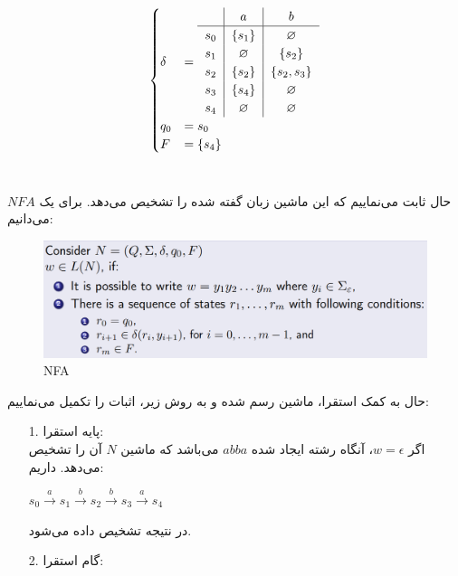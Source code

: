 \begin{enumerate}
\begin{center}
\begin{equation*}
\begin{cases}
        \delta &=
        \begin{tabular}{c|c|c}
         & $a$ & $b$ \\ \hline
        $s_0$ & $\{s_1\}$ &$\varnothing$\\
        $s_1$ & $\varnothing$ &$\{s_2\}$\\
        $s_2$ & $\{s_2\}$ &$\{s_2, s_3\}$\\
        $s_3$ & $\{s_4\}$ &$\varnothing$\\
        $s_4$ & $\varnothing$ &$\varnothing$ \\
        \end{tabular}\\[0.1in]
        q_0 &= s_0\\
        F &= \{s_4\}\\
    \end{cases}
    \end{equation*}
    \\[0.3in]
\end{center}
حال ثابت می‌نماییم که این ماشین زبان گفته شده را تشخیص می‌دهد.
برای یک $NFA$ می‌دانیم:\newline
\begin{figure} [H]
    \centering
    \includegraphics[scale=0.65]{solution/5-2.png}
        \caption{NFA}
    \label{nfa}
\end{figure}
حال به کمک استقرا، ماشین رسم شده و به روش زیر، اثبات را تکمیل می‌نماییم:\\[0.1in]
\begin{enumerate}
    \item[1.] پایه استقرا:\\[0.1in]
    اگر $w = \epsilon$، آنگاه رشته ایجاد شده $abba$ می‌باشد که ماشین $N$ آن را تشخیص می‌دهد. داریم:\\[0.1in]
    \begin{center}
        $s_0 \xrightarrow{a} s_1 \xrightarrow{b} s_2
        \xrightarrow{b} s_3 \xrightarrow{a} s_4$
    \end{center}
    در نتیجه تشخیص داده می‌شود.
    \\[0.05in]
    \item[2.] گام استقرا:\\[0.1in]

\end{enumerate}
\end{enumerate}

